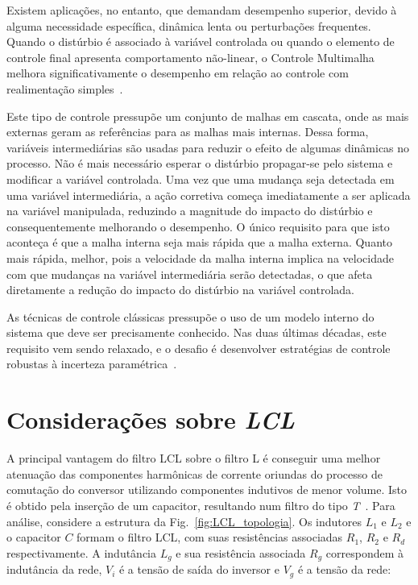 	Existem aplicações, no entanto, que demandam desempenho superior, devido à alguma
	necessidade específica, dinâmica lenta ou perturbações frequentes. Quando o distúrbio
	é associado à variável controlada ou quando o elemento de controle final apresenta
	comportamento não-linear, o Controle Multimalha melhora significativamente o
	desempenho em relação ao controle com realimentação simples~\cite{ref:KRISHNA}.

	Este tipo de controle pressupõe um conjunto de malhas em cascata, onde as mais
	externas geram as referências para as malhas mais internas. Dessa forma, variáveis
	intermediárias são usadas para reduzir o efeito de algumas dinâmicas no processo.
	Não é mais necessário esperar o distúrbio propagar-se pelo sistema e modificar a
	variável controlada. Uma vez que uma mudança seja detectada em uma variável
	intermediária, a ação corretiva começa imediatamente a ser aplicada na variável
	manipulada, reduzindo a magnitude do impacto do distúrbio e consequentemente
	melhorando o desempenho. O único requisito para que isto aconteça é que a malha
	interna seja mais rápida que a malha externa. Quanto mais rápida, melhor, pois
	a velocidade da malha interna implica na velocidade com que mudanças na variável
	intermediária serão detectadas, o que afeta diretamente a redução do impacto
	do distúrbio na variável controlada.

	As técnicas de controle clássicas pressupõe o uso de um modelo interno do sistema
	que deve ser precisamente conhecido. Nas duas últimas décadas, este requisito
	vem sendo relaxado, e o desafio é desenvolver estratégias de controle robustas
	à incerteza paramétrica~\cite{ref:GEROMEL}.


\section{Considerações sobre \emph{LCL}}

    A principal vantagem do filtro LCL sobre o filtro L é conseguir uma melhor
    atenuação das componentes harmônicas de corrente oriundas do processo de comutação do
    conversor utilizando componentes indutivos de menor volume. Isto é obtido pela
    inserção de um capacitor, resultando num filtro do tipo \emph{T}~\cite{ref:SHEN}.
    Para análise, considere a estrutura da Fig.~\ref{fig:LCL_topologia}. Os indutores
    $L_1$ e $L_2$ e o capacitor $C$ formam o filtro LCL, com suas resistências
    associadas $R_1$, $R_2$ e $R_d$ respectivamente. A indutância $L_g$ e sua
    resistência associada $R_g$ correspondem à indutância da rede, $V_i$
    é a tensão de saída do inversor e $V_g$ é a tensão da rede:

